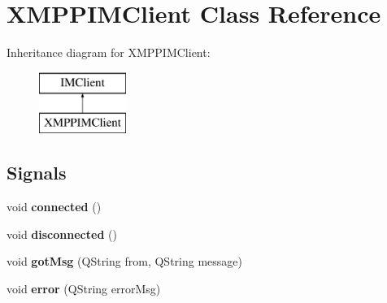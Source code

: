 \hypertarget{classXMPPIMClient}{
\section{XMPPIMClient Class Reference}
\label{classXMPPIMClient}
}
Inheritance diagram for XMPPIMClient:\begin{figure}[H]
\begin{center}
\leavevmode
\includegraphics[height=2cm]{classXMPPIMClient}
\end{center}
\end{figure}
\subsection*{Signals}
\begin{DoxyCompactItemize}
\item 
\hypertarget{classXMPPIMClient_a374a5a7a31bfbb09cd6d3bd86c0b506e}{
void {\bfseries connected} ()}
\label{classXMPPIMClient_a374a5a7a31bfbb09cd6d3bd86c0b506e}

\item 
\hypertarget{classXMPPIMClient_a5499b021b2c9140775335583346ba53f}{
void {\bfseries disconnected} ()}
\label{classXMPPIMClient_a5499b021b2c9140775335583346ba53f}

\item 
\hypertarget{classXMPPIMClient_a566e19792d539ca5e45d0436ca8321c6}{
void {\bfseries gotMsg} (QString from, QString message)}
\label{classXMPPIMClient_a566e19792d539ca5e45d0436ca8321c6}

\item 
\hypertarget{classXMPPIMClient_af8f0aa177ce72d26718a67457ae2139b}{
void {\bfseries error} (QString errorMsg)}
\label{classXMPPIMClient_af8f0aa177ce72d26718a67457ae2139b}

\end{DoxyCompactItemize}

